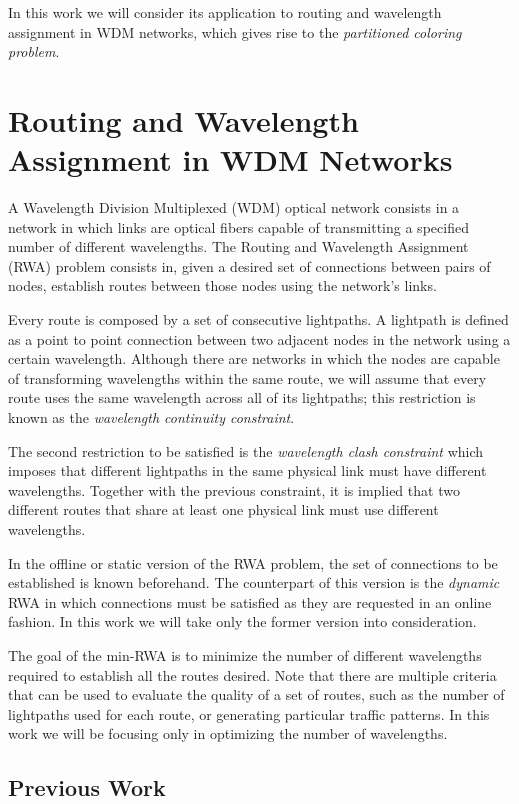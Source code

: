 In this work we will consider its application to routing and wavelength assignment in WDM networks, which gives rise to the \textit{partitioned coloring problem}.

\section{Routing and Wavelength Assignment in WDM Networks}

A Wavelength Division Multiplexed (WDM) optical network consists in a network in which links are optical fibers capable of transmitting a specified number of different wavelengths. The Routing and Wavelength Assignment (RWA) problem consists in, given a desired set of connections between pairs of nodes, establish routes between those nodes using the network's links.

Every route is composed by a set of consecutive lightpaths. A lightpath is defined as a point to point connection between two adjacent nodes in the network using a certain wavelength. Although there are networks in which the nodes are capable of transforming wavelengths within the same route, we will assume that every route uses the same wavelength across all of its lightpaths; this restriction is known as the \textit{wavelength continuity constraint}.

The second restriction to be satisfied is the \textit{wavelength clash constraint} which imposes that different lightpaths in the same physical link must have different wavelengths. Together with the previous constraint, it is implied that two different routes that share at least one physical link must use different wavelengths.

In the offline or static version of the RWA problem, the set of connections to be established is known beforehand. The counterpart of this version is the \textit{dynamic} RWA in which connections must be satisfied as they are requested in an online fashion. In this work we will take only the former version into consideration.

The goal of the min-RWA is to minimize the number of different wavelengths required to establish all the routes desired. Note that there are multiple criteria that can be used to evaluate the quality of a set of routes, such as the number of lightpaths used for each route, or generating particular traffic patterns. In this work we will be focusing only in optimizing the number of wavelengths.

\subsection*{Previous Work}

